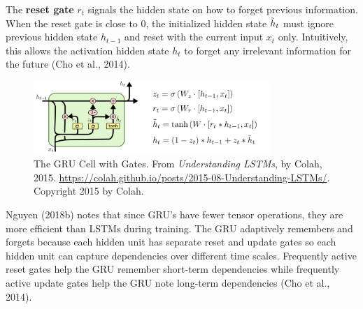 The \textbf{reset gate} $r_t$ signals the hidden state on how to forget previous information. When the reset gate is close to $0$, the initialized hidden state $\Tilde{h}_t$ must ignore previous hidden state $h_{t-1}$ and reset with the current input $x_t$ only. Intuitively, this allows the activation hidden state $h_t$ to forget any irrelevant information for the future (Cho et al., 2014). 

\begin{figure}[h]
\vspace{-5pt}
\centering
\includegraphics[width=0.8\textwidth]{imgs/gru_withformula.png}
\vspace{-5pt}
\caption{\footnotesize The GRU Cell with Gates. From \emph{Understanding LSTMs}, by Colah, 2015. \url{https://colah.github.io/posts/2015-08-Understanding-LSTMs/}. Copyright 2015 by Colah.}
\vspace{-5pt}
\label{fig:gru}
\end{figure}

Nguyen (2018b) notes that since GRU's have fewer tensor operations, they are more efficient than LSTMs during training. 
The GRU adaptively remembers and forgets because each hidden unit has separate reset and update gates so each hidden unit can capture dependencies over different time scales. Frequently active reset gates help the GRU remember short-term dependencies while frequently active update gates help the GRU note long-term dependencies (Cho et al., 2014). 

